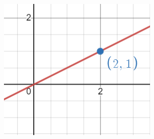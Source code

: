 \documentclass[a4paper,12pt,reqno,oneside]{amsart}
\theoremstyle{plain}
\numberwithin{equation}{section}
\begin{document}
 \begin{center}
     \includegraphics{"figure1.png"}
 \end{center}
 
\end{document}
